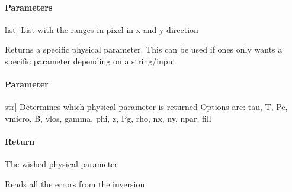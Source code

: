 \documentclass[letterpaper,10pt,english]{sphinxmanual}
\begin{document}
\begin{fulllineitems}
\begin{fulllineitems}
\paragraph{Parameters}
\label{\detokenize{classes:id14}}\begin{description}
\sphinxlineitem{Map}{[}list{]}
\sphinxAtStartPar
List with the ranges in pixel in x and y direction

\end{description}

\end{fulllineitems}


\begin{fulllineitems}
\label{\detokenize{classes:id15}}
\pysigstartsignatures
{}
\pysigstopsignatures
\sphinxAtStartPar
Returns a specific physical parameter. This can be used if ones only wants a specific
parameter depending on a string/input


\paragraph{Parameter}
\label{\detokenize{classes:id16}}\begin{description}
\sphinxlineitem{string}{[}str{]}
\sphinxAtStartPar
Determines which physical parameter is returned
Options are: tau, T, Pe, vmicro, B, vlos, gamma, phi, z, Pg, rho, nx, ny, npar, fill

\end{description}


\paragraph{Return}
\label{\detokenize{classes:id17}}
\sphinxAtStartPar
The wished physical parameter

\end{fulllineitems}


\begin{fulllineitems}
\label{\detokenize{classes:id18}}
\pysigstartsignatures
{}
\pysigstopsignatures
\sphinxAtStartPar
Reads all the errors from the inversion



\end{fulllineitems}
\end{fulllineitems}
\end{document}
